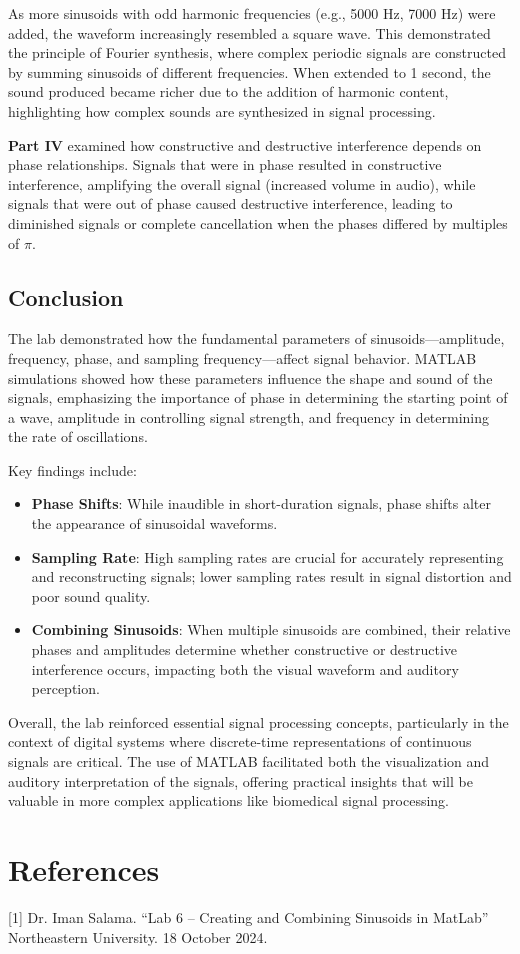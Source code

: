 \documentclass{article}
\begin{document}
As more sinusoids with odd harmonic frequencies (e.g., 5000 Hz, 7000 Hz) were 
added, the waveform increasingly resembled a square wave. This demonstrated the 
principle of Fourier synthesis, where complex periodic signals are constructed by 
summing sinusoids of different frequencies. When extended to 1 second, the sound 
produced became richer due to the addition of harmonic content, highlighting how 
complex sounds are synthesized in signal processing.
\newline

\textbf{Part IV} examined how constructive and destructive interference depends on 
phase relationships. Signals that were in phase resulted in constructive interference, 
amplifying the overall signal (increased volume in audio), while signals that were out 
of phase caused destructive interference, leading to diminished signals or complete 
cancellation when the phases differed by multiples of \( \pi \).
\newline

\subsection{Conclusion}

The lab demonstrated how the fundamental parameters of sinusoids—amplitude, 
frequency, phase, and sampling frequency—affect signal behavior. MATLAB 
simulations showed how these parameters influence the shape and sound of the 
signals, emphasizing the importance of phase in determining the starting point 
of a wave, amplitude in controlling signal strength, and frequency in determining 
the rate of oscillations.
\newline

Key findings include:
\begin{itemize}
    \item \textbf{Phase Shifts}: While inaudible in short-duration signals, phase shifts alter the appearance of sinusoidal waveforms.
    \item \textbf{Sampling Rate}: High sampling rates are crucial for accurately representing and reconstructing signals; lower sampling rates result in signal distortion and poor sound quality.
    \item \textbf{Combining Sinusoids}: When multiple sinusoids are combined, their relative phases and amplitudes determine whether constructive or destructive interference occurs, impacting both the visual waveform and auditory perception.
\end{itemize}

Overall, the lab reinforced essential signal processing concepts, particularly in 
the context of digital systems where discrete-time representations of continuous 
signals are critical. The use of MATLAB facilitated both the visualization and 
auditory interpretation of the signals, offering practical insights that will be 
valuable in more complex applications like biomedical signal processing.


\section{References}
 [1] Dr. Iman Salama. “Lab 6 – Creating and Combining Sinusoids in MatLab” Northeastern University. 18 October 2024.
\end{document}
